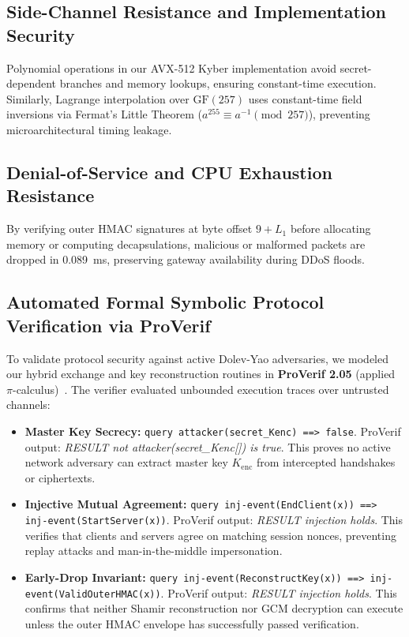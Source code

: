 \documentclass[sn-mathphys,Numbered]{sn-jnl}%
\theoremstyle{thmstyleone}%
\theoremstyle{thmstyletwo}%
\theoremstyle{thmstylethree}%
\begin{document}
\subsection{\textbf{Side-Channel Resistance and Implementation Security}}
Polynomial operations in our AVX-512 Kyber implementation avoid secret-dependent branches and memory lookups, ensuring constant-time execution. Similarly, Lagrange interpolation over $\text{GF}(257)$ uses constant-time field inversions via Fermat's Little Theorem ($a^{255} \equiv a^{-1} \pmod{257}$), preventing microarchitectural timing leakage.

\subsection{\textbf{Denial-of-Service and CPU Exhaustion Resistance}}
By verifying outer HMAC signatures at byte offset $9 + L_1$ before allocating memory or computing decapsulations, malicious or malformed packets are dropped in 0.089~ms, preserving gateway availability during DDoS floods.

\subsection{\textbf{Automated Formal Symbolic Protocol Verification via ProVerif}}
\label{sec:proverif}
To validate protocol security against active Dolev-Yao adversaries, we modeled our hybrid exchange and key reconstruction routines in \textbf{ProVerif 2.05} (applied $\pi$-calculus)~\cite{blanchet2022proverif,meier2013tamarin}. The verifier evaluated unbounded execution traces over untrusted channels:
\begin{itemize}
    \item \textbf{Master Key Secrecy:} \texttt{query attacker(secret\_Kenc) ==> false}. ProVerif output: \textit{RESULT not attacker(secret\_Kenc[]) is true}. This proves no active network adversary can extract master key $K_{\text{enc}}$ from intercepted handshakes or ciphertexts.
    \item \textbf{Injective Mutual Agreement:} \texttt{query inj-event(EndClient(x)) ==> inj-event(StartServer(x))}. ProVerif output: \textit{RESULT injection holds}. This verifies that clients and servers agree on matching session nonces, preventing replay attacks and man-in-the-middle impersonation.
    \item \textbf{Early-Drop Invariant:} \texttt{query inj-event(ReconstructKey(x)) ==> inj-event(ValidOuterHMAC(x))}. ProVerif output: \textit{RESULT injection holds}. This confirms that neither Shamir reconstruction nor GCM decryption can execute unless the outer HMAC envelope has successfully passed verification.
\end{itemize}
\end{document}
